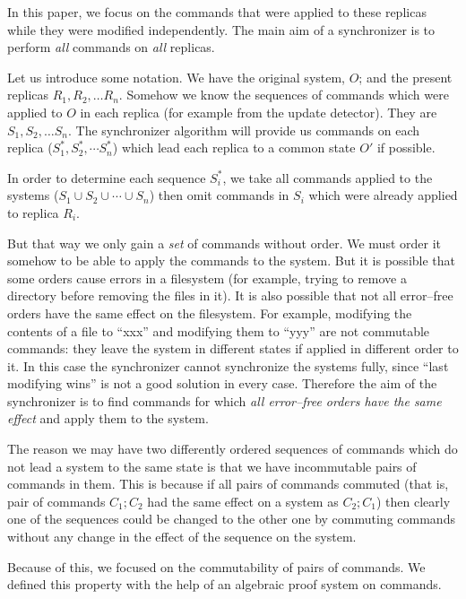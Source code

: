 In this paper,
we focus on the commands that were applied to these replicas while they
were modified independently. The main aim of a synchronizer is to perform
\emph{all} commands on \emph{all} replicas.

Let us introduce some notation. We have the original system, \(O\); 
and the present replicas \(R_1, R_2, \ldots R_n\).
Somehow we know the sequences of commands which were applied to
\(O\) in each replica (for example from the update detector). They are
\(S_1, S_2, \ldots S_n\). The synchronizer algorithm will provide us
commands on each replica (\(S_1^*, S_2^*, \cdots S_n^*\)) which lead each
replica to a common state \(O'\) if possible.

In order to determine each sequence \(S_i^*\), we take all commands
applied
to the systems (\(S_1\cup S_2\cup \cdots\cup S_n\)) then omit commands
in \(S_i\) which were already applied to replica \(R_i\). 

But that way we only gain a \emph{set} of commands without order. We
must order it somehow to be able to apply the commands to the
system. But it is possible that some orders cause errors in a filesystem
(for example, trying to remove a directory before removing the files in
it). It is also possible that not all error--free orders have the same
effect on the filesystem. For example, modifying the contents of a file to
``xxx'' and modifying them to ``yyy'' are not commutable commands: they
leave the system in different states if applied in different order to it.
In this case the synchronizer cannot synchronize the systems fully, since
``last modifying wins'' is not a good solution in every case.  
Therefore the aim of the synchronizer is to find commands for which 
\emph{all error--free orders have
the same effect} and apply them to the system.

The reason we may have two differently ordered sequences of commands which
do not lead a system to the same state is that we have incommutable pairs
of commands in them. This is because if all pairs of commands
commuted (that is, pair of commands \(C_1; C_2\) had the same effect on
a system as \(C_2; C_1\)) then clearly one of the sequences could be
changed to the other one by commuting commands
without any change in the effect of the sequence on the system. 

Because of this, we focused on the commutability of pairs of commands.  
We defined this property with the help of an algebraic 
proof system on commands.%


